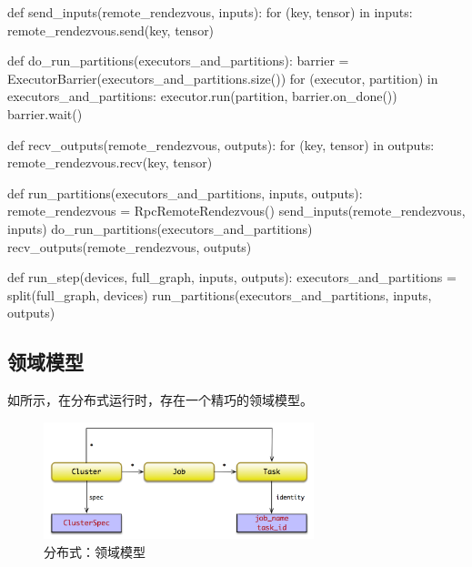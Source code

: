 \begin{content}

\begin{leftbar}
\begin{python}
def send_inputs(remote_rendezvous, inputs):
  for (key, tensor) in inputs:
    remote_rendezvous.send(key, tensor)

def do_run_partitions(executors_and_partitions):
  barrier = ExecutorBarrier(executors_and_partitions.size())
  for (executor, partition) in executors_and_partitions:
    executor.run(partition, barrier.on_done())  
  barrier.wait()

def recv_outputs(remote_rendezvous, outputs):
  for (key, tensor) in outputs:
    remote_rendezvous.recv(key, tensor)

def run_partitions(executors_and_partitions, inputs, outputs):
  remote_rendezvous = RpcRemoteRendezvous()
  send_inputs(remote_rendezvous, inputs)
  do_run_partitions(executors_and_partitions)
  recv_outputs(remote_rendezvous, outputs)

def run_step(devices, full_graph, inputs, outputs):
  executors_and_partitions = split(full_graph, devices)
  run_partitions(executors_and_partitions, inputs, outputs)
\end{python}
\end{leftbar}

\subsection{领域模型}

如所示，在\tf{}分布式运行时，存在一个精巧的领域模型。

\begin{figure}[H]
\centering
\includegraphics[width=0.7\textwidth]{figures/cc-dist-model.png}
\caption{分布式：领域模型}
 \label{fig:cc-dist-model}
\end{figure}


\end{content}
